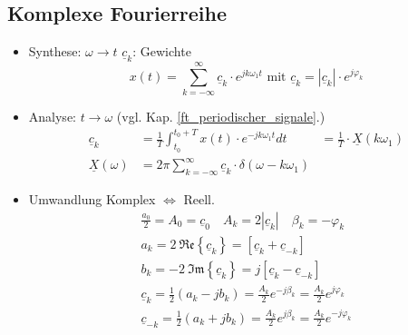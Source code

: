 \subsection{Komplexe Fourierreihe}\label{komplexe_fr}
	\begin{itemize}
		\item Synthese: $\omega \rightarrow t$
		{\small\quad $\underline{c}_k$: Gewichte}
		\[
		x(t)= \sum_{k=-\infty}^{\infty} \underline{c}_k\cdot e^{jk \omega_1  t} \text{ mit } \underline{c}_k = |\underline{c}_k|\cdot e^{j\varphi_k}
		\]
		\item Analyse: $t \rightarrow \omega$ (vgl. Kap. \ref{ft_periodischer_signale}.)
		\begin{align*}
			\underline{c}_k & = \frac{1}{T}\int_{t_0}^{t_0+T} x(t)\cdot e^{-jk\omega_1  t}dt
			& = \boxed{\frac{1}{T} \cdot \underline{X}(k\omega_1) }\\
			\underline{X}(\omega)&=2\pi \sum_{k=-\infty}^{\infty} \underline{c}_k \cdot \delta(\omega-k\omega_1)
		\end{align*}
	\item Umwandlung Komplex $\Leftrightarrow$ Reell.
	\begin{gather*}
		\frac{a_0}{2} = A_0 = \underline{c}_0 \quad A_k = 2|\underline{c}_k| \quad \beta_k = -\varphi_k\\
			a_k = 2\ \mathfrak{Re}\left\{ \underline{c}_k \right\}= \left[ \underline{c}_k+\underline{c}_{-k} \right]\\
			b_k = -2\ \mathfrak{Im}\left\{ \underline{c}_k \right\}= j\left[ \underline{c}_k-\underline{c}_{-k} \right]\\
			\underline{c}_k = \frac{1}{2}\left( a_k-jb_k \right) = \frac{A_k}{2} e^{-j\beta_k} = \frac{A_k}{2} e^{j\varphi_k}\\
			\underline{c}_{-k} = \frac{1}{2}\left( a_k+jb_k \right) = \frac{A_k}{2} e^{j\beta_k} = \frac{A_k}{2} e^{-j\varphi_k}
	\end{gather*}
	\end{itemize}




